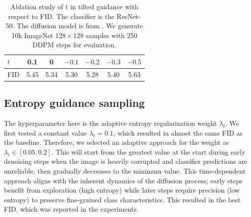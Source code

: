 \documentclass{article}
\begin{document}
\begin{table}[h]
  \centering
  \caption{ Ablation study of $t$ in tilted guidance with respect to FID. The classifier is the
ResNet-50. The diffusion model is from \cite{dhariwal2021diffusion}. We generate 10k
ImageNet $128\times128$ samples with 250 DDPM steps for evaluation.
}
\vspace{5pt}
  \label{tab:fid_t}
  \begin{tabular}{lcccccc}
    \toprule
    $t$ & 0.1 & 0 & $-0.1$ & $-0.2$ & $-0.3$ & $-0.5$\\
    \midrule
    FID      & 5.45 & 5.34 & 5.30 & 5.28 & 5.40 & 5.63\\
    \bottomrule
  \end{tabular}
\end{table}
\subsection{Entropy guidance sampling }
The hyperparameter here is the adaptive entropy regularization weight $\lambda_t$. We first tested a constant value $\lambda_t = 0.1$, which resulted in almost the same FID as the baseline. Therefore, we selected an adaptive approach for the weight as $\lambda_t \in \left[ 0.05, 0.2\right]$. This will start from the greatest value at the start during early denoising steps when the image is heavily corrupted and classifier predictions are unreliable, then gradually decreases to the minimum value. This time-dependent approach aligns with the inherent dynamics of the diffusion process; early steps benefit from exploration (high entropy) while later steps require precision (low entropy) to preserve fine-grained class characteristics. This resulted in the best FID, which was reported in the experiments. 
\end{document}

